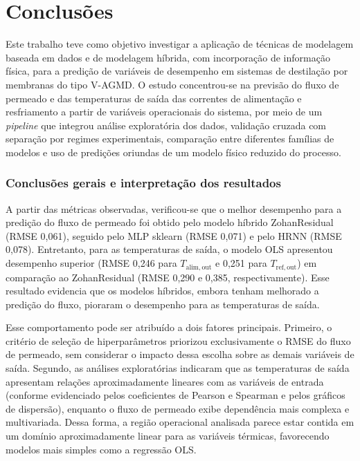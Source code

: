 \chapter{Conclusões}
\label{chap:conclusoes}

Este trabalho teve como objetivo investigar a aplicação de técnicas de modelagem baseada em dados e de modelagem híbrida, com incorporação de informação física, para a predição de variáveis de desempenho em sistemas de destilação por membranas do tipo V-AGMD. O estudo concentrou-se na previsão do fluxo de permeado e das temperaturas de saída das correntes de alimentação e resfriamento a partir de variáveis operacionais do sistema, por meio de um \textit{pipeline} que integrou análise exploratória dos dados, validação cruzada com separação por regimes experimentais, comparação entre diferentes famílias de modelos e uso de predições oriundas de um modelo físico reduzido do processo.

\subsection{Conclusões gerais e interpretação dos resultados}

A partir das métricas observadas, verificou-se que o melhor desempenho para a predição do fluxo de permeado foi obtido pelo modelo híbrido ZohanResidual (RMSE 0,061), seguido pelo MLP sklearn (RMSE 0,071) e pelo HRNN (RMSE 0,078). Entretanto, para as temperaturas de saída, o modelo OLS apresentou desempenho superior (RMSE 0,246 para $T_{\mathrm{alim,out}}$ e 0,251 para $T_{\mathrm{ref,out}}$) em comparação ao ZohanResidual (RMSE 0,290 e 0,385, respectivamente). Esse resultado evidencia que os modelos híbridos, embora tenham melhorado a predição do fluxo, pioraram o desempenho para as temperaturas de saída.

Esse comportamento pode ser atribuído a dois fatores principais. Primeiro, o critério de seleção de hiperparâmetros priorizou exclusivamente o RMSE do fluxo de permeado, sem considerar o impacto dessa escolha sobre as demais variáveis de saída. Segundo, as análises exploratórias indicaram que as temperaturas de saída apresentam relações aproximadamente lineares com as variáveis de entrada (conforme evidenciado pelos coeficientes de Pearson e Spearman e pelos gráficos de dispersão), enquanto o fluxo de permeado exibe dependência mais complexa e multivariada. Dessa forma, a região operacional analisada parece estar contida em um domínio aproximadamente linear para as variáveis térmicas, favorecendo modelos mais simples como a regressão OLS.

